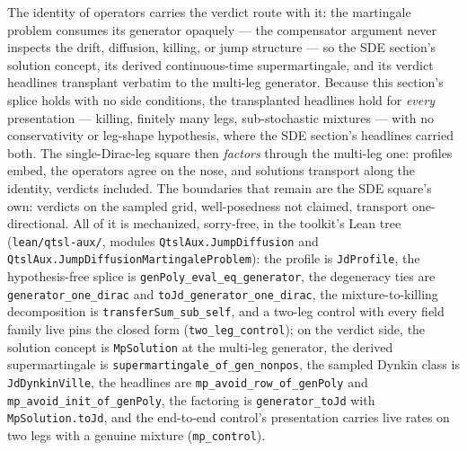 The identity of operators carries the verdict route with it: the
martingale problem consumes its generator opaquely --- the compensator
argument never inspects the drift, diffusion, killing, or jump
structure --- so the SDE section's solution concept, its derived
continuous-time supermartingale, and its verdict headlines transplant
verbatim to the multi-leg generator. Because this section's splice
holds with no side conditions, the transplanted headlines hold for
\emph{every} presentation --- killing, finitely many legs,
sub-stochastic mixtures --- with no conservativity or leg-shape
hypothesis, where the SDE section's headlines carried both. The
single-Dirac-leg square then \emph{factors} through the multi-leg one:
profiles embed, the operators agree on the nose, and solutions
transport along the identity, verdicts included. The boundaries
that remain are the SDE square's own: verdicts on the sampled grid,
well-posedness not claimed, transport one-directional. All of it is
mechanized, sorry-free, in the toolkit's Lean tree
(\texttt{lean/qtsl-aux/}, modules \texttt{QtslAux.JumpDiffusion} and
\texttt{QtslAux.JumpDiffusionMartingaleProblem}): the profile is
\texttt{JdProfile}, the hypothesis-free splice is
\texttt{genPoly\_eval\_eq\_generator}, the degeneracy ties are
\texttt{generator\_one\_dirac} and \texttt{toJd\_generator\_one\_dirac},
the mixture-to-killing decomposition is \texttt{transferSum\_sub\_self},
and a two-leg control with every field family live pins the closed form
(\texttt{two\_leg\_control}); on the verdict side, the solution concept
is \texttt{MpSolution} at the multi-leg generator, the derived
supermartingale is \texttt{supermartingale\_of\_gen\_nonpos}, the
sampled Dynkin class is \texttt{JdDynkinVille}, the headlines are
\texttt{mp\_avoid\_row\_of\_genPoly} and
\texttt{mp\_avoid\_init\_of\_genPoly}, the factoring is
\texttt{generator\_toJd} with \texttt{MpSolution.toJd}, and the
end-to-end control's presentation carries live rates on two legs with a
genuine mixture (\texttt{mp\_control}).

